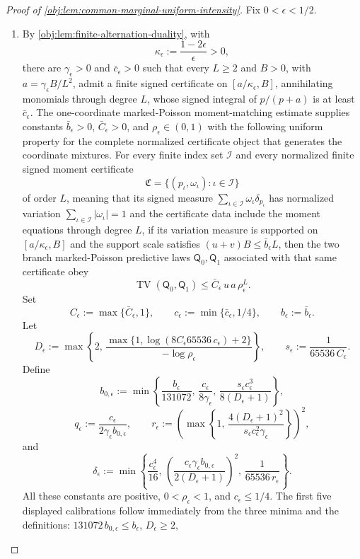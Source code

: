 \begin{proof}[Proof of \cref{obj:lem:common-marginal-uniform-intensity}]
Fix \(0<\epsilon<1/2\).
\begin{enumerate}
\item By \cref{obj:lem:finite-alternation-duality}, with
\[
\kappa_\epsilon:=\frac{1-2\epsilon}{\epsilon}>0,
\]
there are \(\gamma_\epsilon>0\) and \(\bar c_\epsilon>0\) such that every \(L\ge2\) and \(B>0\), with \(a=\gamma_\epsilon B/L^2\), admit a finite signed certificate on \([a/\kappa_\epsilon,B]\), annihilating monomials through degree \(L\), whose signed integral of \(p/(p+a)\) is at least \(\bar c_\epsilon\). The one-coordinate marked-Poisson moment-matching estimate supplies constants \(\bar b_\epsilon>0\), \(\bar C_\epsilon>0\), and \(\rho_\epsilon\in(0,1)\) with the following uniform property for the complete normalized certificate object that generates the coordinate mixtures. For every finite index set \(\mathcal I\) and every normalized finite signed moment certificate
\[
\mathfrak C=\{(p_\iota,\omega_\iota):\iota\in\mathcal I\}
\]
of order \(L\), meaning that its signed measure \(\sum_{\iota\in\mathcal I}\omega_\iota\delta_{p_\iota}\) has normalized variation \(\sum_{\iota\in\mathcal I}|\omega_\iota|=1\) and the certificate data include the moment equations through degree \(L\), if its variation measure is supported on \([a/\kappa_\epsilon,B]\) and the support scale satisfies \((u+v)B\le \bar b_\epsilon L\), then the two branch marked-Poisson predictive laws \(\mathsf Q_0,\mathsf Q_1\) associated with that same certificate obey
\[
\operatorname{TV}(\mathsf Q_0,\mathsf Q_1)
 \le \bar C_\epsilon\,u\,a\,\rho_\epsilon^L .
\] Set
\[
C_\epsilon:=\max\{\bar C_\epsilon,1\},\qquad
c_\epsilon:=\min\{\bar c_\epsilon,1/4\},\qquad
b_\epsilon:=\bar b_\epsilon .
\]
Let
\[
D_\epsilon
:=\max\left\{
2,\,
\frac{\max\{1,\log(8C_\epsilon 65536\,c_\epsilon)+2\}}
{-\log\rho_\epsilon}
\right\},
\qquad
s_\epsilon:=\frac1{65536\,C_\epsilon}.
\]
Define
\[
b_{0,\epsilon}
:=
\min\left\{
\frac{b_\epsilon}{131072},\,
\frac{c_\epsilon}{8\gamma_\epsilon},\,
\frac{s_\epsilon c_\epsilon^3}{8(D_\epsilon+1)}
\right\},
\]
\[
q_\epsilon:=\frac{c_\epsilon}{2\gamma_\epsilon b_{0,\epsilon}},
\qquad
r_\epsilon
:=
\left(
\max\left\{
1,\,
\frac{4(D_\epsilon+1)^2}{s_\epsilon c_\epsilon^2\gamma_\epsilon}
\right\}
\right)^2,
\]
and
\[
\delta_\epsilon
:=
\min\left\{
\frac{c_\epsilon^4}{16},\,
\left(\frac{c_\epsilon\gamma_\epsilon b_{0,\epsilon}}
{2(D_\epsilon+1)}\right)^2,\,
\frac{1}{65536\,r_\epsilon}
\right\}.
\]
All these constants are positive, \(0<\rho_\epsilon<1\), and \(c_\epsilon\le1/4\). The first five displayed calibrations follow immediately from the three minima and the definitions: \(131072\,b_{0,\epsilon}\le b_\epsilon\), \(D_\epsilon\ge2\),

\end{enumerate}
\end{proof}
